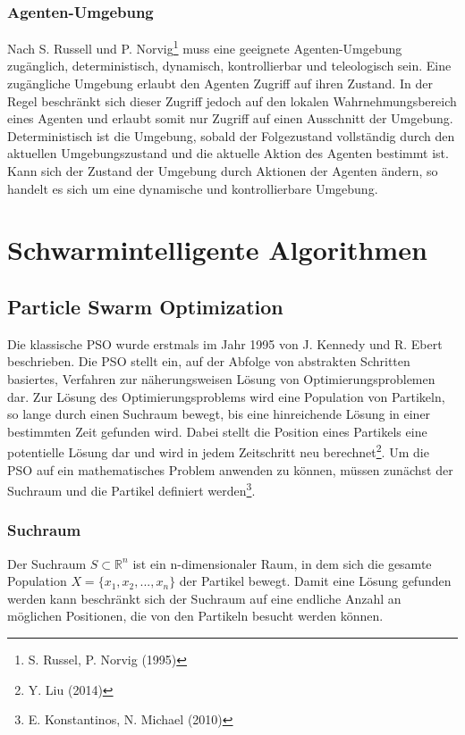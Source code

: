 \documentclass[a4paper, 11pt]{article}
\begin{document}
\subsubsection{Agenten-Umgebung}
Nach S. Russell und P. Norvig\footnote{S. Russel, P. Norvig (1995)} muss eine geeignete Agenten-Umgebung zugänglich, deterministisch, dynamisch, kontrollierbar und teleologisch sein. Eine zugängliche Umgebung erlaubt den Agenten Zugriff auf ihren Zustand. In der Regel beschränkt sich dieser Zugriff jedoch auf den lokalen Wahrnehmungsbereich eines Agenten und erlaubt somit nur Zugriff auf einen Ausschnitt der Umgebung. Deterministisch ist die Umgebung, sobald der Folgezustand vollständig durch den aktuellen Umgebungszustand und die aktuelle Aktion des Agenten bestimmt ist. Kann sich der Zustand der Umgebung durch Aktionen der Agenten ändern, so handelt es sich um eine dynamische und kontrollierbare Umgebung.
\newpage
\section{Schwarmintelligente Algorithmen}
\subsection{Particle Swarm Optimization}
Die klassische \ac{PSO} wurde erstmals im Jahr 1995 von J. Kennedy und R. Ebert beschrieben. Die \acs{PSO} stellt ein, auf der Abfolge von abstrakten Schritten basiertes, Verfahren zur näherungsweisen Lösung von Optimierungsproblemen dar. Zur Lösung des Optimierungsproblems wird eine Population von Partikeln, so lange durch einen Suchraum bewegt, bis eine hinreichende Lösung in einer bestimmten Zeit gefunden wird. Dabei stellt die Position eines Partikels eine potentielle Lösung dar und wird in jedem Zeitschritt neu berechnet\footnote{Y. Liu (2014)}. Um die \acs{PSO} auf ein mathematisches Problem anwenden zu können, müssen zunächst der Suchraum und die Partikel definiert werden\footnote{E. Konstantinos, N. Michael (2010)}.
\subsubsection{Suchraum}
Der Suchraum $S \subset \mathbb{R}^n$ ist ein n-dimensionaler Raum, in dem sich die gesamte Population $X=\{x_{1},x_{2},...,x_{n}\}$ der Partikel bewegt. Damit eine Lösung gefunden werden kann beschränkt sich der Suchraum auf eine endliche Anzahl an möglichen Positionen, die von den Partikeln besucht werden können.
\end{document}
